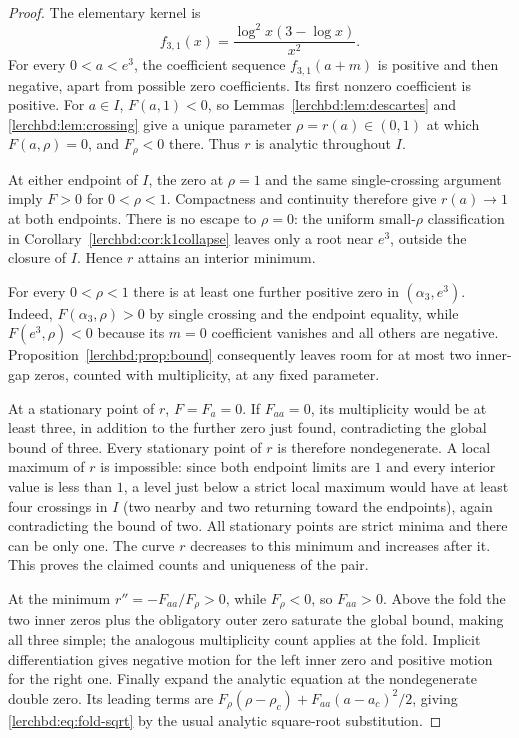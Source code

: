 \begin{proof}
The elementary kernel is
\[
 f_{3,1}(x)=\frac{\log^2x(3-\log x)}{x^2}.
\]
For every $0<a<e^3$, the coefficient sequence $f_{3,1}(a+m)$ is positive and then negative, apart from possible zero coefficients. Its first nonzero coefficient is positive. For $a\in I$, $F(a,1)<0$, so Lemmas~\ref{lerchbd:lem:descartes} and \ref{lerchbd:lem:crossing} give a unique parameter $\rho=r(a)\in(0,1)$ at which $F(a,\rho)=0$, and $F_\rho<0$ there. Thus $r$ is analytic throughout $I$.

At either endpoint of $I$, the zero at $\rho=1$ and the same single-crossing argument imply $F>0$ for $0<\rho<1$. Compactness and continuity therefore give $r(a)\to1$ at both endpoints. There is no escape to $\rho=0$: the uniform small-$\rho$ classification in Corollary~\ref{lerchbd:cor:k1collapse} leaves only a root near $e^3$, outside the closure of $I$. Hence $r$ attains an interior minimum.

For every $0<\rho<1$ there is at least one further positive zero in $(\alpha_3,e^3)$. Indeed, $F(\alpha_3,\rho)>0$ by single crossing and the endpoint equality, while $F(e^3,\rho)<0$ because its $m=0$ coefficient vanishes and all others are negative. Proposition~\ref{lerchbd:prop:bound} consequently leaves room for at most two inner-gap zeros, counted with multiplicity, at any fixed parameter.

At a stationary point of $r$, $F=F_a=0$. If $F_{aa}=0$, its multiplicity would be at least three, in addition to the further zero just found, contradicting the global bound of three. Every stationary point of $r$ is therefore nondegenerate. A local maximum of $r$ is impossible: since both endpoint limits are $1$ and every interior value is less than $1$, a level just below a strict local maximum would have at least four crossings in $I$ (two nearby and two returning toward the endpoints), again contradicting the bound of two. All stationary points are strict minima and there can be only one. The curve $r$ decreases to this minimum and increases after it. This proves the claimed counts and uniqueness of the pair.

At the minimum $r''=-F_{aa}/F_\rho>0$, while $F_\rho<0$, so $F_{aa}>0$. Above the fold the two inner zeros plus the obligatory outer zero saturate the global bound, making all three simple; the analogous multiplicity count applies at the fold. Implicit differentiation gives negative motion for the left inner zero and positive motion for the right one. Finally expand the analytic equation at the nondegenerate double zero. Its leading terms are $F_\rho(\rho-\rho_c)+F_{aa}(a-a_c)^2/2$, giving \eqref{lerchbd:eq:fold-sqrt} by the usual analytic square-root substitution.
\end{proof}

